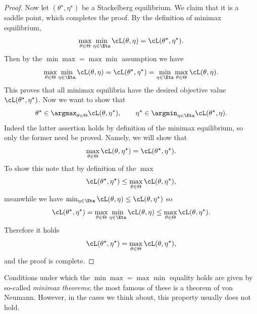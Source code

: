 \documentclass[../../book-main.tex]{subfiles}
\begin{document}
\begin{proof}
    Now let \((\theta^{\star}, \eta^{\star})\) be a Stackelberg
    equilibrium. We claim that it is a saddle point, which completes
    the proof. By the definition of minimax equilibrium,
    \begin{equation}
        \max_{\theta \in \Theta}\min_{\eta \in \Eta}\cL(\theta, \eta)
        = \cL(\theta^{\star}, \eta^{\star}).
    \end{equation}
    Then by the \(\min\max = \max\min\) assumption we have
    \begin{equation}
        \max_{\theta \in \Theta}\min_{\eta \in \Eta}\cL(\theta, \eta)
        = \cL(\theta^{\star}, \eta^{\star}) = \min_{\eta \in
        \Eta}\max_{\theta \in \Theta}\cL(\theta, \eta).
    \end{equation}
    This proves that all minimax equilibria have the desired
    objective value \(\cL(\theta^{\star}, \eta^{\star})\). Now we
    want to show that
    \begin{equation}
        \theta^{\star} \in \argmax_{\theta \in \Theta}\cL(\theta,
        \eta^{\star}), \qquad \eta^{\star} \in \argmin_{\eta \in
        \Eta}\cL(\theta^{\star}, \eta).
    \end{equation}
    Indeed the latter assertion holds by definition of the minimax
    equilibrium, so only the former need be proved. Namely, we will show that
    \begin{equation}
        \max_{\theta \in \Theta}\cL(\theta, \eta^{\star}) =
        \cL(\theta^{\star}, \eta^{\star}).
    \end{equation}
    To show this note that by definition of the \(\max\)
    \begin{equation}
        \cL(\theta^{\star}, \eta^{\star}) \leq \max_{\theta \in
        \Theta}\cL(\theta, \eta^{\star}),
    \end{equation}
    meanwhile we have \(\min_{\eta \in \Eta}\cL(\theta, \eta) \leq
    \cL(\theta, \eta^{\star})\) so
    \begin{equation}
        \cL(\theta^{\star}, \eta^{\star}) = \max_{\theta \in
        \Theta}\min_{\eta \in \Eta}\cL(\theta, \eta) \leq
        \max_{\theta \in \Theta}\cL(\theta, \eta^{\star}).
    \end{equation}
    Therefore it holds
    \begin{equation}
        \cL(\theta^{\star}, \eta^{\star}) = \max_{\theta \in
        \Theta}\cL(\theta, \eta^{\star}),
    \end{equation}
    and the proof is complete.
\end{proof}
Conditions under which the \(\min\max = \max\min\) equality holds are
given by so-called \textit{minimax theorems}; the most famous of
these is a theorem of von Neumann. However, in the cases we think
about, this property usually does not hold.
\end{document}
